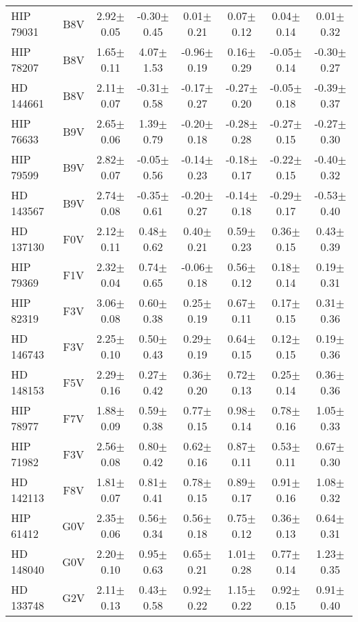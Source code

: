 \begin{table}
\begin{center}
\begin{tabular}{l|c|c|c|c|c|c|c}
HIP 79031 & B8V & 2.92$\pm$0.05 & -0.30$\pm$0.45 & 0.01$\pm$0.21 & 0.07$\pm$0.12 & 0.04$\pm$0.14 & 0.01$\pm$0.32 \\
HIP 78207 & B8V & 1.65$\pm$0.11 & 4.07$\pm$1.53 & -0.96$\pm$0.19 & 0.16$\pm$0.29 & -0.05$\pm$0.14 & -0.30$\pm$0.27 \\
HD 144661 & B8V & 2.11$\pm$0.07 & -0.31$\pm$0.58 & -0.17$\pm$0.27 & -0.27$\pm$0.20 & -0.05$\pm$0.18 & -0.39$\pm$0.37 \\
HIP 76633 & B9V & 2.65$\pm$0.06 & 1.39$\pm$0.79 & -0.20$\pm$0.18 & -0.28$\pm$0.28 & -0.27$\pm$0.15 & -0.27$\pm$0.30 \\
HIP 79599 & B9V & 2.82$\pm$0.07 & -0.05$\pm$0.56 & -0.14$\pm$0.23 & -0.18$\pm$0.17 & -0.22$\pm$0.15 & -0.40$\pm$0.32 \\
HD 143567 & B9V & 2.74$\pm$0.08 & -0.35$\pm$0.61 & -0.20$\pm$0.27 & -0.14$\pm$0.18 & -0.29$\pm$0.17 & -0.53$\pm$0.40 \\
HD 137130 & F0V & 2.12$\pm$0.11 & 0.48$\pm$0.62 & 0.40$\pm$0.21 & 0.59$\pm$0.23 & 0.36$\pm$0.15 & 0.43$\pm$0.39 \\
HIP 79369 & F1V & 2.32$\pm$0.04 & 0.74$\pm$0.65 & -0.06$\pm$0.18 & 0.56$\pm$0.12 & 0.18$\pm$0.14 & 0.19$\pm$0.31 \\
HIP 82319 & F3V & 3.06$\pm$0.08 & 0.60$\pm$0.38 & 0.25$\pm$0.19 & 0.67$\pm$0.11 & 0.17$\pm$0.15 & 0.31$\pm$0.36 \\
HD 146743 & F3V & 2.25$\pm$0.10 & 0.50$\pm$0.43 & 0.29$\pm$0.19 & 0.64$\pm$0.15 & 0.12$\pm$0.15 & 0.19$\pm$0.36 \\
HD 148153 & F5V & 2.29$\pm$0.16 & 0.27$\pm$0.42 & 0.36$\pm$0.20 & 0.72$\pm$0.13 & 0.25$\pm$0.14 & 0.36$\pm$0.36 \\
HIP 78977 & F7V & 1.88$\pm$0.09 & 0.59$\pm$0.38 & 0.77$\pm$0.15 & 0.98$\pm$0.14 & 0.78$\pm$0.16 & 1.05$\pm$0.33 \\
HIP 71982 & F3V & 2.56$\pm$0.08 & 0.80$\pm$0.42 & 0.62$\pm$0.16 & 0.87$\pm$0.11 & 0.53$\pm$0.11 & 0.67$\pm$0.30 \\
HD 142113 & F8V & 1.81$\pm$0.07 & 0.81$\pm$0.41 & 0.78$\pm$0.15 & 0.89$\pm$0.17 & 0.91$\pm$0.16 & 1.08$\pm$0.32 \\
HIP 61412 & G0V & 2.35$\pm$0.06 & 0.56$\pm$0.34 & 0.56$\pm$0.18 & 0.75$\pm$0.12 & 0.36$\pm$0.13 & 0.64$\pm$0.31 \\
HD 148040 & G0V & 2.20$\pm$0.10 & 0.95$\pm$0.63 & 0.65$\pm$0.21 & 1.01$\pm$0.28 & 0.77$\pm$0.14 & 1.23$\pm$0.35 \\
HD 133748 & G2V & 2.11$\pm$0.13 & 0.43$\pm$0.58 & 0.92$\pm$0.22 & 1.15$\pm$0.22 & 0.92$\pm$0.15 & 0.91$\pm$0.40 \\

\end{tabular}
\end{center}
\end{table}
